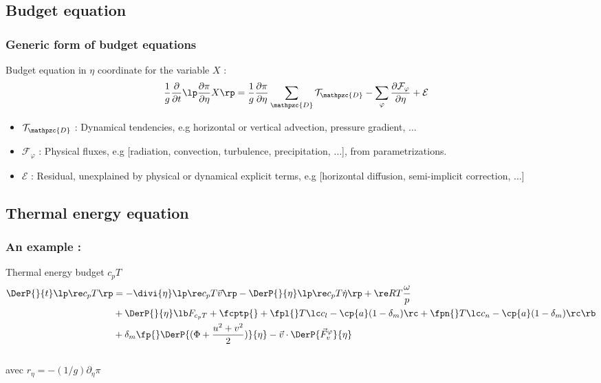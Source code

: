 \documentclass[aspectratio=169]{beamer}
\newcommand{\dr}{\partial}
\begin{document}
\subsection{Budget equation}
\begin{frame}
\frametitle{\normalsize Generic form of budget equations}
\vspace{-0.25cm}
\begin{block}{\small Budget equation in $\eta$ coordinate for the variable $X$ :}
%  
\small
\begin{align*}
\frac{1}{g}\frac{\dr}{\dr t}\lp \frac{\dr \pi}{\dr\eta}X \rp & = 
\frac{1}{g}\frac{\dr \pi}{\dr\eta}\sum_{\mathpzc{D}} \mathcal{T}_{\mathpzc{D}} 
- \sum_{\varphi} \frac{\dr \mathcal{F}_{\varphi}}{\dr\eta}
+ \mathcal{E}
\end{align*}
%
\begin{itemize}
\item $\mathcal{T}_{\mathpzc{D}}$ : Dynamical tendencies, e.g horizontal or vertical advection, pressure gradient,  $\ldots$
%
\item $\mathcal{F}_{\varphi}$ : Physical fluxes, e.g [radiation, convection, turbulence, precipitation, $\ldots$], from parametrizations.
%
\item $\mathcal{E}$ : Residual, unexplained by physical or dynamical explicit terms, e.g [horizontal diffusion, semi-implicit correction, ...]
\end{itemize}
%
\end{block}
\end{frame}

\subsection{Thermal energy equation}
\begin{frame}
\frametitle{{\normalsize An example :} }

\begin{block}{Thermal energy budget $c_p T$}
\footnotesize
\begin{align}
  \DerP{}{t}\lp\re c_p T\rp &=
  - \divi{\eta}\lp\re c_p T \vec{v}\rp
  - \DerP{}{\eta}\lp\re c_p T \dot{\eta}\rp
  + \re R T \frac{\omega}{p}\nonumber \\
  &  +\DerP{}{\eta}\lb F_{c_p T} + \fcptp{}
  + \fpl{} T \lc c_l - \cp{a} (1-\delta_m)\rc 
  + \fpn{} T \lc c_n - \cp{a} (1-\delta_m)\rc\rb\nonumber\\
  & 
  +\delta_m\fp{}\DerP{(\Phi+\frac{u^2+v^2}{2})}{\eta}
  -\vec v\cdot\DerP{\vec F_v^{\varphi}}{\eta}\label{Bilh}
\end{align}
\vspace*{0.5cm}\\
avec $r_{\eta}=-(1/g)\dr_{\eta}\pi$
\end{block}


\logos

\end{frame}
\end{document}
